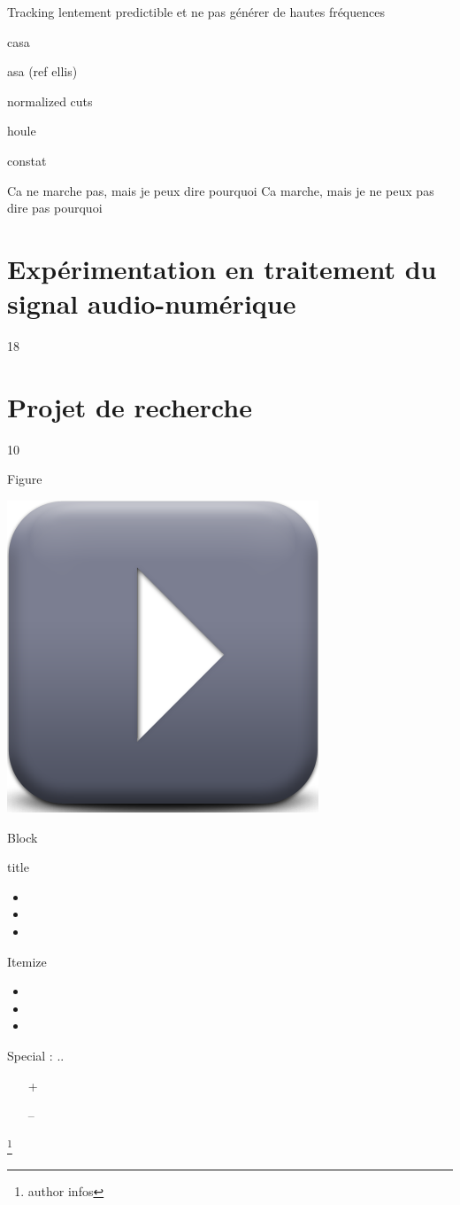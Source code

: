 \documentclass[compress]{beamer}
\let\oldfootnote\footnote
\renewcommand\footnote[1]{\let\thefootnote\relax%
\oldfootnote{#1}}
\newcommand\citenote[4]{\footnote{#3 \href{#2}{\structure{#1}} #4}}
\begin{document}
Tracking lentement predictible et ne pas générer de hautes fréquences

casa

asa  (ref ellis)

normalized cuts

houle

constat

Ca ne marche pas, mais je peux dire pourquoi
Ca marche, mais je ne peux pas dire pas pourquoi

\section[Expérimentation]{Expérimentation en traitement du signal audio-numérique} 18

\section[Projet]{Projet de recherche} 10


\begin{frame}{} \tableofcontents[currentsection] \end{frame}

\begin{frame}{Figure}
\begin{center}
\includegraphics[width=.6\columnwidth]{figures/play} \\
\end{center}
\end{frame}

\begin{frame}{Block}
\begin{block}{title}
\begin{itemize}
\item
\item
\item
\end{itemize}
\end{block}
\end{frame}


\begin{frame}{Itemize}
\begin{itemize}
\item
\item
\item
\end{itemize}
\end{frame}

\begin{frame}{Special}
: ..
\begin{itemize}
\item[+]
\item[--]
\end{itemize}
\citenote{title}{http://www.google.com}{author}{infos}
\end{frame}
\end{document}
